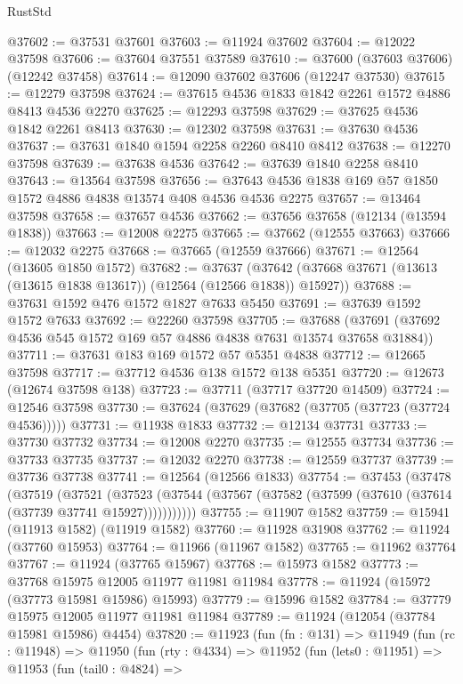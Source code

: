 \begin{lexlean}{RustStd}
\begin{coremodule}
{\begin{coremodule}
{{{{{{{{{{{{{{{{{{{{{{{{{{{{{{{{{{{{{{{{{{{{{{{{{{{{{{{{{{{{{{{{{{{{{{{{{{{{{{{{@37602 := @37531 @37601
@37603 := @11924 @37602
@37604 := @12022 @37598
@37606 := @37604 @37551 @37589
@37610 := @37600 (@37603 @37606) (@12242 @37458)
@37614 := @12090 @37602 @37606 (@12247 @37530)
@37615 := @12279 @37598
@37624 := @37615 @4536 @1833 @1842 @2261 @1572 @4886 @8413 @4536 @2270
@37625 := @12293 @37598
@37629 := @37625 @4536 @1842 @2261 @8413
@37630 := @12302 @37598
@37631 := @37630 @4536
@37637 := @37631 @1840 @1594 @2258 @2260 @8410 @8412
@37638 := @12270 @37598
@37639 := @37638 @4536
@37642 := @37639 @1840 @2258 @8410
@37643 := @13564 @37598
@37656 := @37643 @4536 @1838 @169 @57 @1850 @1572 @4886 @4838 @13574 @408 @4536 @4536 @2275
@37657 := @13464 @37598
@37658 := @37657 @4536
@37662 := @37656 @37658 (@12134 (@13594 @1838))
@37663 := @12008 @2275
@37665 := @37662 (@12555 @37663)
@37666 := @12032 @2275
@37668 := @37665 (@12559 @37666)
@37671 := @12564 (@13605 @1850 @1572)
@37682 := @37637
    (@37642 (@37668 @37671 (@13613 (@13615 @1838 @13617)) (@12564 (@12566 @1838)) @15927))
@37688 := @37631 @1592 @476 @1572 @1827 @7633 @5450
@37691 := @37639 @1592 @1572 @7633
@37692 := @22260 @37598
@37705 := @37688 (@37691 (@37692 @4536 @545 @1572 @169 @57 @4886 @4838 @7631 @13574 @37658 @31884))
@37711 := @37631 @183 @169 @1572 @57 @5351 @4838
@37712 := @12665 @37598
@37717 := @37712 @4536 @138 @1572 @138 @5351
@37720 := @12673 (@12674 @37598 @138)
@37723 := @37711 (@37717 @37720 @14509)
@37724 := @12546 @37598
@37730 := @37624 (@37629 (@37682 (@37705 (@37723 (@37724 @4536)))))
@37731 := @11938 @1833
@37732 := @12134 @37731
@37733 := @37730 @37732
@37734 := @12008 @2270
@37735 := @12555 @37734
@37736 := @37733 @37735
@37737 := @12032 @2270
@37738 := @12559 @37737
@37739 := @37736 @37738
@37741 := @12564 (@12566 @1833)
@37754 := @37453
    (@37478
      (@37519
        (@37521
          (@37523 (@37544 (@37567 (@37582 (@37599 (@37610 (@37614 (@37739 @37741 @15927)))))))))))
@37755 := @11907 @1582
@37759 := @15941 (@11913 @1582) (@11919 @1582)
@37760 := @11928 @31908
@37762 := @11924 (@37760 @15953)
@37764 := @11966 (@11967 @1582)
@37765 := @11962 @37764
@37767 := @11924 (@37765 @15967)
@37768 := @15973 @1582
@37773 := @37768 @15975 @12005 @11977 @11981 @11984
@37778 := @11924 (@15972 (@37773 @15981 @15986) @15993)
@37779 := @15996 @1582
@37784 := @37779 @15975 @12005 @11977 @11981 @11984
@37789 := @11924 (@12054 (@37784 @15981 @15986) @4454)
@37820 := @11923
    (fun (fn : @131) =>
    @11949
      (fun (rc : @11948) =>
      @11950
        (fun (rty : @4334) =>
        @11952
          (fun (lets0 : @11951) =>
          @11953
            (fun (tail0 : @4824) =>
}}}}}}}}}}}}}}}}}}}}}}}}}}}}}}}}}}}}}}}}}}}}}}}}}}}}}}}}}}}}}}}}}}}}}}}}}}}}}}}}
\end{coremodule}}
\end{coremodule}
\end{lexlean}
